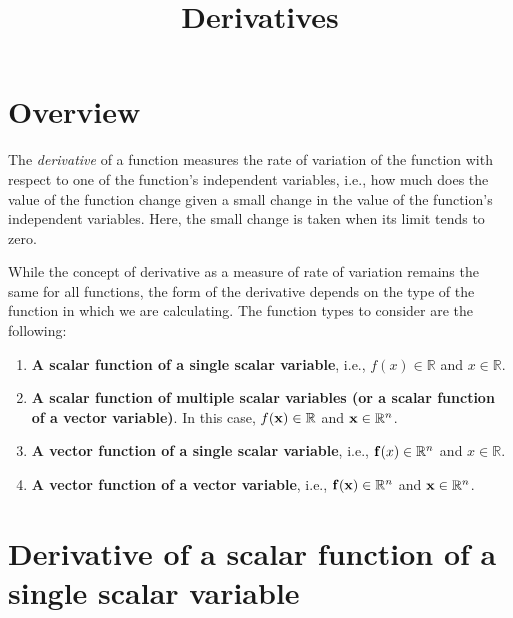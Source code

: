 \documentclass[12pt,letter]{article}
\title{Derivatives}
\date{}
\begin{document}
\maketitle
\vspace{-1.0in}

{\small 
\tableofcontents
}

\section{Overview}
The {\em derivative} of a function measures the rate of variation of the function with respect to one of the function's independent variables, i.e., how much does the value of the function change given a small change in the value of the function's independent variables. Here, the small change is taken when its limit tends to zero. 

While the concept of derivative as a measure of rate of variation remains the same for all functions, the form of the derivative depends on the type of the function in which we are calculating.  The function types to consider are the following: 

\begin{enumerate}
	\item {\bf A scalar function of a single scalar variable}, i.e.,   $f(x) \in \mathbb{R}$ and $x \in \mathbb{R}$.
	\item {\bf A scalar function of multiple scalar variables (or a scalar function of a vector variable)}. In this case, $f({\bf x}) \in \mathbb{R}$ and ${\bf x} \in \mathbb{R}^n$.
	\item  {\bf A vector function of a single scalar variable}, i.e., ${\bf f}(x) \in \mathbb{R}^n$ and ${x} \in \mathbb{R}$. 
	\item {\bf A vector function of a vector variable}, i.e., ${\bf f}({\bf x}) \in \mathbb{R}^n$ and ${\bf x} \in \mathbb{R}^n$. 	

\end{enumerate}

\section{Derivative of a scalar function of a single scalar variable}
\end{document}
